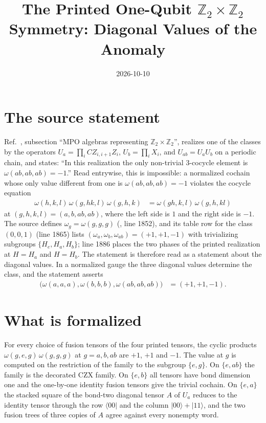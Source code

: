 \documentclass{article}
\title{The Printed One-Qubit $\mathbb{Z}_2\times\mathbb{Z}_2$ Symmetry:
Diagonal Values of the Anomaly}
\author{}
\date{2026-10-10}
\begin{document}
\maketitle
{}

\section{The source statement}

Ref.~\cite{GarreRubio2023MPOSym}, subsection ``MPO algebras representing
$\mathbb{Z}_2\times\mathbb{Z}_2$'', realizes one of the classes by the
operators $U_a=\prod_i CZ_{i,i+1}Z_i$, $U_b=\prod_i X_i$, and
$U_{ab}=U_aU_b$ on a periodic chain, and states: ``In this realization the
only non-trivial $3$-cocycle element is $\omega(ab,ab,ab)=-1$.''
Read entrywise, this is impossible: a normalized cochain whose only value
different from one is $\omega(ab,ab,ab)=-1$ violates the cocycle equation
\begin{align}
    \omega(h,k,l)\,\omega(g,hk,l)\,\omega(g,h,k)
     & =\omega(gh,k,l)\,\omega(g,h,kl)
    \label{eq:glm23kleinprinted_cocycle}
\end{align}
at $(g,h,k,l)=(a,b,ab,ab)$, where the left side is $1$ and the right side
is $-1$. The source defines $\omega_g=\omega(g,g,g)$
(, line 1852), and its table row for
the class $(0,0,1)$ (line 1865) lists $(\omega_a,\omega_b,\omega_{ab})=(+1,+1,-1)$
with trivializing subgroups $\{H_e,H_a,H_b\}$; line 1886 places the two phases of
the printed realization at $H=H_a$ and $H=H_b$. The statement is therefore
read as a statement about the diagonal values. In a normalized gauge the three diagonal
values determine the class, and the statement asserts
\begin{align}
    \bigl(\omega(a,a,a),\omega(b,b,b),\omega(ab,ab,ab)\bigr)
     & =(+1,+1,-1).
    \label{eq:glm23kleinprinted_source_signs}
\end{align}

\section{What is formalized}

For every choice of fusion tensors of the four printed tensors, the cyclic
products $\omega(g,e,g)\,\omega(g,g,g)$ at $g=a,b,ab$ are $+1$, $+1$ and $-1$.
The value at $g$ is computed on the restriction of the family to the subgroup
$\{e,g\}$. On $\{e,ab\}$ the family is the decorated CZX family. On $\{e,b\}$
all tensors have bond dimension one and the one-by-one identity fusion tensors
give the trivial cochain. On $\{e,a\}$ the stacked square of the bond-two
diagonal tensor $A$ of $U_a$ reduces to the identity tensor through the row
$\langle 00|$ and the column $|00\rangle+|11\rangle$, and the two fusion trees
of three copies of $A$ agree against every nonempty word.
\end{document}
